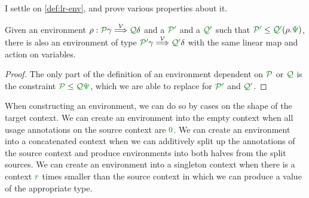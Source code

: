 I settle on \cref{def:lr-env}, and prove various properties about it.

\begin{lemma}\label{thm:env-resize}
  Given an environment $\rho : \grP\gamma \env\V \grQ\delta$ and a $\grPprime$
  and a $\grQprime$ such that $\grPprime \leq \grQprime\plr{\rho.\gr\Psi}$,
  there is also an environment of type $\grPprime\gamma \env\V \grQprime\delta$
  with the same linear map and action on variables.
\end{lemma}
\begin{proof}
  The only part of the definition of an environment dependent on $\grP$ or
  $\grQ$ is the constraint $\grP \leq \grQ\gr\Psi$, which we are able to
  replace for $\grPprime$ and $\grQprime$.
\end{proof}

When constructing an environment, we can do so by cases on the shape of the
target context.
We can create an environment into the empty context when all usage annotations
on the source context are $\gr0$.
We can create an environment into a concatenated context when we can additively
split up the annotations of the source context and produce environments into
both halves from the split sources.
We can create an environment into a singleton context when there is a context
$\gr r$ times smaller than the source context in which we can produce a value
of the appropriate type.

